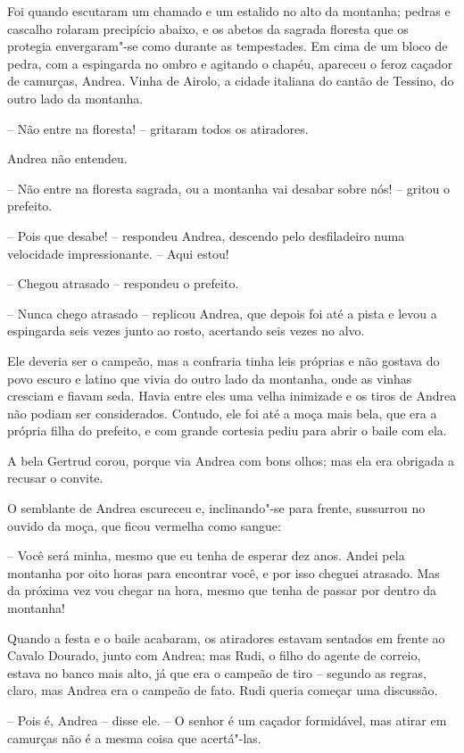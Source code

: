 Foi quando escutaram um chamado e um estalido no alto da montanha;
pedras e cascalho rolaram precipício abaixo, e os abetos da sagrada
floresta que os protegia envergaram"-se como durante as tempestades.
Em cima de um bloco de pedra, com a espingarda no ombro e agitando o
chapéu, apareceu o feroz caçador de camurças, Andrea. Vinha de Airolo,
a cidade italiana do cantão de Tessino, do outro lado da montanha.

-- Não entre na floresta! -- gritaram todos os atiradores.

Andrea não entendeu.

-- Não entre na floresta sagrada, ou a montanha vai desabar sobre nós! --
gritou o prefeito.

-- Pois que desabe! -- respondeu Andrea, descendo pelo desfiladeiro numa
velocidade impressionante. -- Aqui estou!

-- Chegou atrasado -- respondeu o prefeito.

-- Nunca chego atrasado -- replicou Andrea, que depois foi até a pista e
levou a espingarda seis vezes junto ao rosto, acertando seis vezes no
alvo.

Ele deveria ser o campeão, mas a confraria tinha leis próprias e não
gostava do povo escuro e latino que vivia do outro lado da montanha,
onde as vinhas cresciam e fiavam seda. Havia entre eles uma velha
inimizade e os tiros de Andrea não podiam ser considerados. Contudo,
ele foi até a moça mais bela, que era a própria filha do prefeito, e
com grande cortesia pediu para abrir o baile com ela.

A bela Gertrud corou, porque via Andrea com bons olhos; mas ela era
obrigada a recusar o convite.

O semblante de Andrea escureceu e, inclinando"-se para frente,
sussurrou no ouvido da moça, que ficou vermelha como sangue:

-- Você será minha, mesmo que eu tenha de esperar dez anos. Andei pela
montanha por oito horas para encontrar você, e por isso cheguei
atrasado. Mas da próxima vez vou chegar na hora, mesmo que tenha de
passar por dentro da montanha!

Quando a festa e o baile acabaram, os atiradores estavam sentados em
frente ao Cavalo Dourado, junto com Andrea; mas Rudi, o filho do agente
de correio, estava no banco mais alto, já que era o campeão de tiro --
segundo as regras, claro, mas Andrea era o campeão de fato. Rudi queria
começar uma discussão.

-- Pois é, Andrea -- disse ele. -- O senhor é um caçador formidável, mas
atirar em camurças não é a mesma coisa que acertá"-las.


